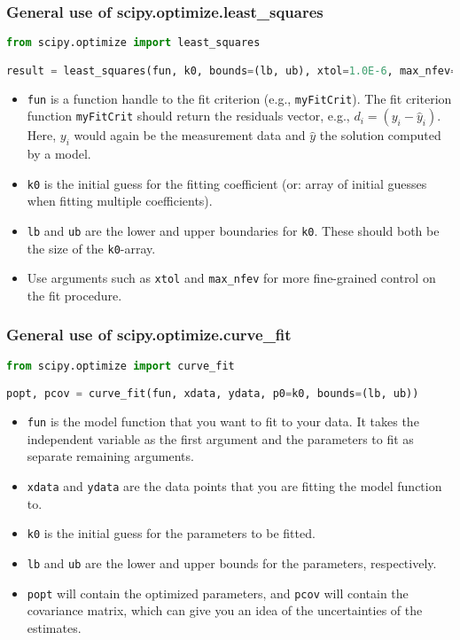   \begin{frame}[fragile] 
    \frametitle{General use of scipy.optimize.least\_squares}
    \begin{lstlisting}[language=Python]
from scipy.optimize import least_squares

result = least_squares(fun, k0, bounds=(lb, ub), xtol=1.0E-6, max_nfev=1000)
    \end{lstlisting}
    \begin{itemize}
      \item \lstinline$fun$ is a function handle to the fit criterion (e.g., \lstinline$myFitCrit$). The fit criterion function \lstinline$myFitCrit$ should return the residuals vector, e.g., $d_i = \left(y_i - \hat{y}_i\right)$. Here, $y_i$ would again be the measurement data and $\hat{y}$ the solution computed by a model.
      \item \lstinline$k0$ is the initial guess for the fitting coefficient (or: array of initial guesses when fitting multiple coefficients).
      \item \lstinline$lb$ and \lstinline$ub$ are the lower and upper boundaries for \lstinline$k0$. These should both be the size of the \lstinline$k0$-array.
      \item Use arguments such as \lstinline$xtol$ and \lstinline$max_nfev$ for more fine-grained control on the fit procedure. 
    \end{itemize}  
  \end{frame}
  
  
  \begin{frame}[fragile] 
  \frametitle{General use of scipy.optimize.curve\_fit}
  \begin{lstlisting}[language=Python]
from scipy.optimize import curve_fit

popt, pcov = curve_fit(fun, xdata, ydata, p0=k0, bounds=(lb, ub))
  \end{lstlisting}
  \begin{itemize}
    \item \lstinline$fun$ is the model function that you want to fit to your data. It takes the independent variable as the first argument and the parameters to fit as separate remaining arguments.
    \item \lstinline$xdata$ and \lstinline$ydata$ are the data points that you are fitting the model function to.
    \item \lstinline$k0$ is the initial guess for the parameters to be fitted.
    \item \lstinline$lb$ and \lstinline$ub$ are the lower and upper bounds for the parameters, respectively.
    \item \lstinline$popt$ will contain the optimized parameters, and \lstinline$pcov$ will contain the covariance matrix, which can give you an idea of the uncertainties of the estimates.
  \end{itemize}  
  \end{frame}
    

